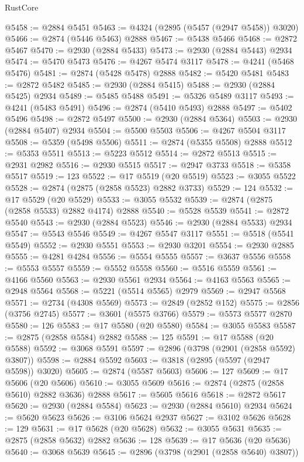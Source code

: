 \begin{lexlean}{RustCore}
\begin{coremodule}
@5458 := @2884 @5451
@5463 := @4324 (@2895 (@5457 (@2947 @5458)) @3020)
@5466 := @2874 (@5446 @5463) @2888
@5467 := @5438 @5466
@5468 := @2872 @5467
@5470 := @2930 (@2884 @5433)
@5473 := @2930 (@2884 @5443) @2934
@5474 := @5470 @5473
@5476 := @4267 @5474 @3117
@5478 := @4241 (@5468 @5476)
@5481 := @2874 (@5428 @5478) @2888
@5482 := @5420 @5481
@5483 := @2872 @5482
@5485 := @2930 (@2884 @5415)
@5488 := @2930 (@2884 @5425) @2934
@5489 := @5485 @5488
@5491 := @5326 @5489 @3117
@5493 := @4241 (@5483 @5491)
@5496 := @2874 (@5410 @5493) @2888
@5497 := @5402 @5496
@5498 := @2872 @5497
@5500 := @2930 (@2884 @5364)
@5503 := @2930 (@2884 @5407) @2934
@5504 := @5500 @5503
@5506 := @4267 @5504 @3117
@5508 := @5359 (@5498 @5506)
@5511 := @2874 (@5355 @5508) @2888
@5512 := @5353 @5511
@5513 := @5223 @5512
@5514 := @2872 @5513
@5515 := @2931 @2982
@5516 := @2930 @5515
@5517 := @2947 @3733
@5518 := @5358 @5517
@5519 := 123
@5522 := @17 @5519 (@20 @5519)
@5523 := @3055 @5522
@5528 := @2874 (@2875 (@2858 @5523) @2882 @3733)
@5529 := 124
@5532 := @17 @5529 (@20 @5529)
@5533 := @3055 @5532
@5539 := @2874 (@2875 (@2858 @5533) @2882 @4174) @2888
@5540 := @5528 @5539
@5541 := @2872 @5540
@5543 := @2930 (@2884 @5523)
@5546 := @2930 (@2884 @5533) @2934
@5547 := @5543 @5546
@5549 := @4267 @5547 @3117
@5551 := @5518 (@5541 @5549)
@5552 := @2930 @5551
@5553 := @2930 @3201
@5554 := @2930 @2885
@5555 := @4281 @4284
@5556 := @5554 @5555
@5557 := @3637 @5556
@5558 := @5553 @5557
@5559 := @5552 @5558
@5560 := @5516 @5559
@5561 := @4166 @5560
@5563 := @2930 @5561 @2934
@5564 := @4163 @5563
@5565 := @2948 @5564
@5568 := @5221 (@5514 @5565) @2979
@5569 := @2947 @5568
@5571 := @2734 (@4308 @5569)
@5573 := @2849 (@2852 @152)
@5575 := @2856 (@3756 @2745)
@5577 := @3601 (@5575 @3766)
@5579 := @5573 @5577 @2870
@5580 := 126
@5583 := @17 @5580 (@20 @5580)
@5584 := @3055 @5583
@5587 := @2875 (@2858 @5584) @2882
@5588 := 125
@5591 := @17 @5588 (@20 @5588)
@5592 := @3068 @5591
@5597 := @2896 (@3798 (@2901 (@2858 @5592) @3807))
@5598 := @2884 @5592
@5603 := @3818 (@2895 (@5597 (@2947 @5598)) @3020)
@5605 := @2874 (@5587 @5603)
@5606 := 127
@5609 := @17 @5606 (@20 @5606)
@5610 := @3055 @5609
@5616 := @2874 (@2875 (@2858 @5610) @2882 @3636) @2888
@5617 := @5605 @5616
@5618 := @2872 @5617
@5620 := @2930 (@2884 @5584)
@5623 := @2930 (@2884 @5610) @2934
@5624 := @5620 @5623
@5626 := @3106 @5624 @2937
@5627 := @3102 @5626
@5628 := 129
@5631 := @17 @5628 (@20 @5628)
@5632 := @3055 @5631
@5635 := @2875 (@2858 @5632) @2882
@5636 := 128
@5639 := @17 @5636 (@20 @5636)
@5640 := @3068 @5639
@5645 := @2896 (@3798 (@2901 (@2858 @5640) @3807))

\end{coremodule}
\end{lexlean}
